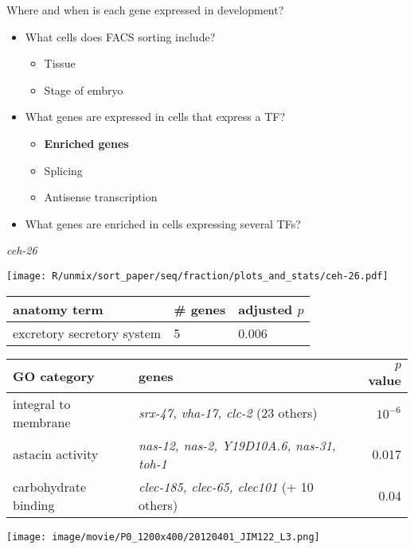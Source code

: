 \documentclass[serif,9pt]{beamer}
\begin{document}
\begin{frame}{Where and when is each gene expressed in development?}
\begin{itemize}
\item What cells does FACS sorting include?
\begin{itemize}
\item Tissue
\item Stage of embryo
\end{itemize}
\item What genes are expressed in cells that express a TF?
\begin{itemize}
\item {\bf Enriched genes}
\item Splicing
\item Antisense transcription
\end{itemize}
\item What genes are enriched in cells expressing several TFs?
\end{itemize}
\end{frame}

\begin{frame}{{\em ceh-26}}

\begin{minipage}{0.4\textwidth}
\texttt{[image: R/unmix/sort\_paper/seq/fraction/plots\_and\_stats/ceh-26.pdf]}
\end{minipage}
\begin{minipage}{0.58\textwidth}
\begin{table}[!tbp]\scriptsize
\begin{tabular}{lll}
anatomy term & \# genes & adjusted $p$ \\
\hline
excretory secretory system & 5 & 0.006 \\
\end{tabular}
\end{table}
\end{minipage}

\begin{table}\footnotesize
\begin{tabular}{llr}
GO category & genes & $p$ value \\
\hline
integral to membrane & {\em srx-47, vha-17, clc-2} (23 others) & $10^{-6}$ \\
astacin activity & {\em nas-12, nas-2, Y19D10A.6, nas-31, toh-1} & 0.017 \\
carbohydrate binding & {\em clec-185, clec-65, clec101} (+ 10 others) & 0.04 \\
\end{tabular}
\end{table}

\texttt{[image: image/movie/P0\_1200x400/20120401\_JIM122\_L3.png]}

\end{frame}
\end{document}
